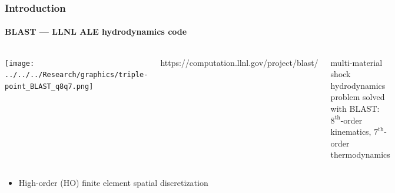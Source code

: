 \documentclass[compress,t]{beamer}
\begin{document}
\begin{frame}
\frametitle{Introduction}
\framesubtitle{BLAST --- LLNL ALE hydrodynamics code}

\begin{columns}[T]
\begin{centering}
\texttt{[image: ../../../Research/graphics/triple-point\_BLAST\_q8q7.png]}
\end{centering}
\tiny{https://computation.llnl.gov/project/blast/}

\vspace{10pt}
\footnotesize{\par multi-material shock hydrodynamics problem solved with BLAST: $8^\text{th}$-order kinematics, $7^\text{th}$-order thermodynamics}
\end{columns}

\begin{itemize}
\item{High-order (HO) finite element spatial discretization}
\end{itemize}

\end{frame}

\end{document}
